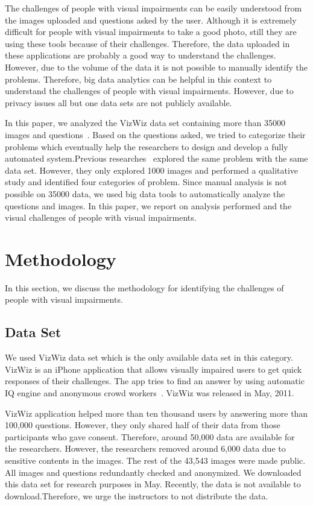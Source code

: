 \documentclass[sigconf]{acmart}
\begin{document}
The challenges of people with visual impairments can be easily understood from the images uploaded and questions asked by the user. Although it is extremely difficult for people with visual impairments to take a good photo, still they are using these tools because of their challenges. Therefore, the data uploaded in these applications are probably a good way to understand the challenges. However, due to the volume of the data it is not possible to manually identify the problems. Therefore, big data analytics can be helpful in this context to understand the challenges of people with visual impairments. However, due to privacy issues all but one data sets are not publicly available. 

In this paper, we analyzed the VizWiz data set containing more than 35000 images and questions~\cite{Bigham:2010}. Based on the questions asked, we tried to categorize their problems which eventually help the researchers to design and develop a fully automated system.Previous researches~\cite{Brady:2013} explored the same problem with the same data set. However, they only explored 1000 images and performed a qualitative study and identified four categories of problem. Since manual analysis is not possible on 35000 data, we used big data tools to automatically analyze the questions and images. In this paper, we report on analysis performed and the visual challenges of people with visual impairments.

\section{Methodology}
In this section, we discuss the methodology for identifying the challenges of people with visual impairments. 

\subsection{Data Set}
We used VizWiz data set which is the only available data set in this category. VizWiz is an iPhone application that allows visually impaired users to get quick responses of their challenges. The app tries to find an answer by using automatic IQ engine and anonymous crowd workers~\cite{vizwiz}. VizWiz was released in May, 2011. 

VizWiz application helped more than ten thousand users by answering more than 100,000 questions. However, they only shared half of their data from those participants who gave consent. Therefore, around 50,000 data are available for the researchers. However, the researchers removed around 6,000 data due to sensitive contents in the images. The rest of the 43,543 images were made public. All images and questions redundantly checked and anonymized. We downloaded this data set for research purposes in May. Recently, the data is not available to download.Therefore, we urge the instructors to not distribute the data. 
\end{document}
